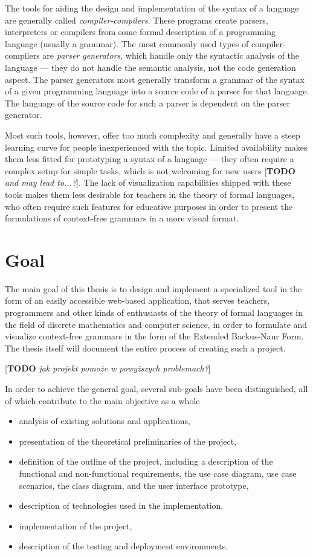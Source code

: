 \documentclass[english,engineering]{wizthesis}
\newcommand{\todo}[1]{{\color{red}[\textbf{TODO} \textit{#1}]}}
\begin{document}
The tools for aiding the design and implementation of the syntax of a language
are generally called \textit{compiler-compilers}. These programs create parsers,
interpreters or compilers from some formal description of a programming
language (usually a grammar). The most commonly used types of
compiler-compilers are \textit{parser generators}, which handle only the
syntactic analysis of the language --- they do not handle the semantic analysis,
not the code generation aspect. The parser generators most generally transform a
grammar of the syntax of a given programming language into a source code of a
parser for that language. The language of the source code for such a parser is
dependent on the parser generator.

Most such tools, however, offer too much complexity and generally have a steep
learning curve for people inexperienced with the topic. Limited availability
makes them less fitted for prototyping a syntax of a language --- they often
require a complex setup for simple tasks, which is not welcoming for new users
\todo{and may lead to...?}. The lack of visualization capabilities shipped with
these tools makes them less desirable for teachers in the theory of formal
languages, who often require such features for educative purposes in order to
present the formulations of context-free grammars in a more visual format.

\section{Goal}

The main goal of this thesis is to design and implement a specialized tool in
the form of an easily accessible web-based application, that serves teachers,
programmers and other kinds of enthusiasts of the theory of formal languages in
the field of discrete mathematics and computer science, in order to formulate
and visualize context-free grammars in the form of the Extended Backus-Naur
Form. The thesis itself will document the entire process of creating such a
project.

\todo{jak projekt pomoże w powyższych problemach?}

In order to achieve the general goal, several sub-goals have been
distinguished, all of which contribute to the main objective as a whole
\begin{itemize}
  \item analysis of existing solutions and applications,
  \item presentation of the theoretical preliminaries of the project,
  \item definition of the outline of the project, including a description of
  the functional and non-functional requirements, the use case diagram, use case
  scenarios, the class diagram, and the user interface prototype,
  \item description of technologies used in the implementation,
  \item implementation of the project,
  \item description of the testing and deployment environments.
\end{itemize}
\end{document}
